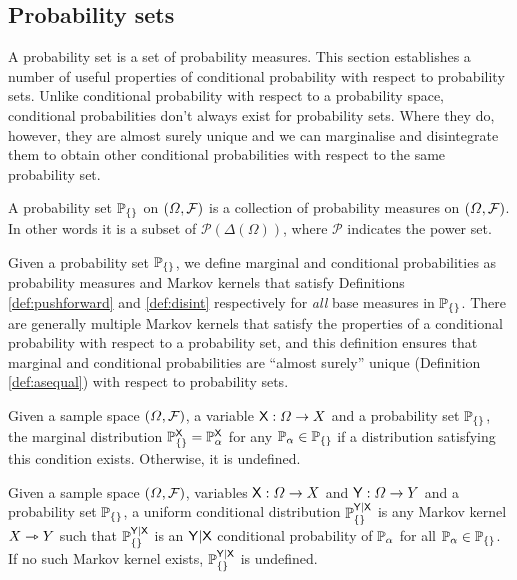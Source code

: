 \subsection{Probability sets}


A probability set is a set of probability measures. This section establishes a number of useful properties of conditional probability with respect to probability sets. Unlike conditional probability with respect to a probability space, conditional probabilities don't always exist for probability sets. Where they do, however, they are almost surely unique and we can marginalise and disintegrate them to obtain other conditional probabilities with respect to the same probability set.

\begin{definition}
A probability set $\mathbb{P}_{\{\}}$ on $(\Omega,\mathcal{F})$ is a collection of probability measures on $(\Omega,\mathcal{F})$. In other words it is a subset of $\mathscr{P}(\Delta(\Omega))$, where $\mathscr{P}$ indicates the power set.
\end{definition}

Given a probability set $\mathbb{P}_{\{\}}$, we define marginal and conditional probabilities as probability measures and Markov kernels that satisfy Definitions \ref{def:pushforward} and \ref{def:disint} respectively for \emph{all} base measures in $\mathbb{P}_{\{\}}$. There are generally multiple Markov kernels that satisfy the properties of a conditional probability with respect to a probability set, and this definition ensures that marginal and conditional probabilities are ``almost surely'' unique (Definition \ref{def:asequal}) with respect to probability sets.

\begin{definition}
Given a sample space $(\Omega,\mathcal{F})$, a variable $\mathsf{X}:\Omega\to X$ and a probability set $\mathbb{P}_{\{\}}$, the marginal distribution $\mathbb{P}_{\{\}}^{\mathsf{X}}=\mathbb{P}_\alpha^{\mathsf{X}}$ for any $\mathbb{P}_\alpha\in\mathbb{P}_{\{\}}$ if a distribution satisfying this condition exists. Otherwise, it is undefined.
\end{definition}

\begin{definition}\label{def:cprob_pset}
Given a sample space $(\Omega,\mathcal{F})$, variables $\mathsf{X}:\Omega\to X$ and $\mathsf{Y}:\Omega\to Y$ and a probability set $\mathbb{P}_{\{\}}$, a uniform conditional distribution $\mathbb{P}_{\{\}}^{\mathsf{Y}|\mathsf{X}}$ is any Markov kernel $X\rightarrowtriangle Y$ such that $\mathbb{P}_{\{\}}^{\mathsf{Y}|\mathsf{X}}$ is an $\mathsf{Y}|\mathsf{X}$ conditional probability of $\mathbb{P}_\alpha$ for all $\mathbb{P}_\alpha\in \mathbb{P}_{\{\}}$. If no such Markov kernel exists, $\mathbb{P}_{\{\}}^{\mathsf{Y}|\mathsf{X}}$ is undefined.
\end{definition}

